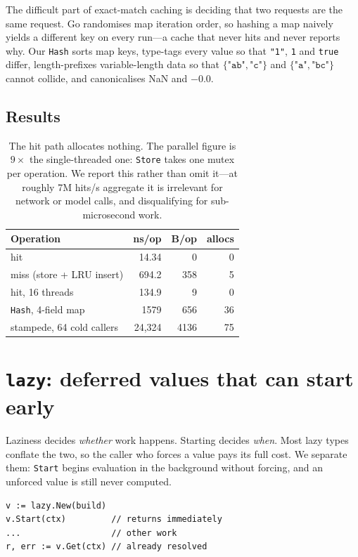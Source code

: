 \documentclass[10pt,twocolumn]{article}
\begin{document}
The difficult part of exact-match caching is deciding that two requests are the
same request. Go randomises map iteration order, so hashing a map naively yields
a different key on every run---a cache that never hits and never reports why. Our
\texttt{Hash} sorts map keys, type-tags every value so that \texttt{"1"}, \texttt{1}
and \texttt{true} differ, length-prefixes variable-length data so that
$\{\texttt{"ab"},\texttt{"c"}\}$ and $\{\texttt{"a"},\texttt{"bc"}\}$ cannot
collide, and canonicalises NaN and $-0.0$.

\subsection{Results}

\begin{table}[h]\centering\small
\begin{tabular}{lrrr}
\toprule
Operation & ns/op & B/op & allocs \\
\midrule
hit                       & 14.34 & 0 & 0 \\
miss (store + LRU insert) & 694.2 & 358 & 5 \\
hit, 16 threads           & 134.9 & 9 & 0 \\
\texttt{Hash}, 4-field map & 1579 & 656 & 36 \\
stampede, 64 cold callers & 24{,}324 & 4136 & 75 \\
\bottomrule
\end{tabular}
\caption{The hit path allocates nothing. The parallel figure is $9\times$ the
single-threaded one: \texttt{Store} takes one mutex per operation. We report this
rather than omit it---at roughly 7M hits/s aggregate it is irrelevant for network
or model calls, and disqualifying for sub-microsecond work.}
\end{table}

\section{\texttt{lazy}: deferred values that can start early}

Laziness decides \emph{whether} work happens. Starting decides \emph{when}. Most
lazy types conflate the two, so the caller who forces a value pays its full cost.
We separate them: \texttt{Start} begins evaluation in the background without
forcing, and an unforced value is still never computed.

\begin{lstlisting}
v := lazy.New(build)
v.Start(ctx)         // returns immediately
...                  // other work
r, err := v.Get(ctx) // already resolved
\end{lstlisting}
\end{document}
